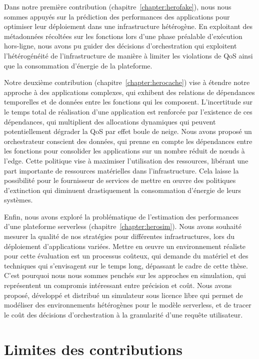 Dans notre première contribution (chapitre~\ref{chapter:herofake}), nous nous sommes appuyés sur la prédiction des performances des applications pour optimiser leur déploiement dans une infrastructure hétérogène. En exploitant des métadonnées récoltées sur les fonctions lors d'une phase préalable d'exécution hors-ligne, nous avons pu guider des décisions d'orchestration qui exploitent l'hétérogénéité de l'infrastructure de manière à limiter les violations de \gls{QoS} ainsi que la consommation d'énergie de la plateforme.

Notre deuxième contribution (chapitre~\ref{chapter:herocache}) vise à étendre notre approche à des applications complexes, qui exhibent des relations de dépendances temporelles et de données entre les fonctions qui les composent. L'incertitude sur le temps total de réalisation d'une application est renforcée par l'existence de ces dépendances, qui multiplient des allocations dynamiques qui peuvent potentiellement dégrader la \gls{QoS} par effet boule de neige. Nous avons proposé un orchestrateur conscient des données, qui prenne en compte les dépendances entre les fonctions pour consolider les applications sur un nombre réduit de nœuds à l'edge. Cette politique vise à maximiser l'utilisation des ressources, libérant une part importante de ressources matérielles dans l'infrastructure. Cela laisse la possibilité pour le fournisseur de services de mettre en œuvre des politiques d'extinction qui diminuent drastiquement la consommation d'énergie de leurs systèmes.

Enfin, nous avons exploré la problématique de l'estimation des performances d'une plateforme serverless (chapitre~\ref{chapter:herosim}). Nous avons souhaité mesurer la qualité de nos stratégies pour différentes infrastructures, lors du déploiement d'applications variées. Mettre en œuvre un environnement réaliste pour cette évaluation est un processus coûteux, qui demande du matériel et des techniques qui s'envisagent sur le temps long, dépassant le cadre de cette thèse. C'est pourquoi nous nous sommes penchés sur les approches en simulation, qui représentent un compromis intéressant entre précision et coût. Nous avons proposé, développé et distribué un simulateur sous licence libre qui permet de modéliser des environnements hétérogènes pour le modèle serverless, et de tracer le coût des décisions d'orchestration à la granularité d'une requête utilisateur.

\section{Limites des contributions}
\label{section:conclusion-limits}

